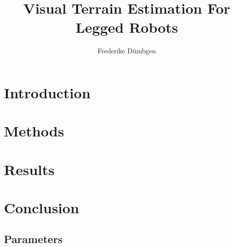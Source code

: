 \documentclass{report}
\begin{document}
\title{Visual Terrain Estimation For Legged Robots}
\author{Frederike Dümbgen}

\maketitle

\tableofcontents

\chapter{Introduction}

\chapter{Methods}



\chapter{Results}



\chapter{Conclusion}


\begin{appendices}

\chapter{Parameters}


\end{appendices}




\end{document}
